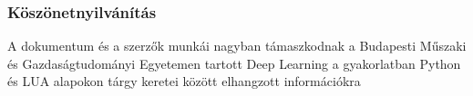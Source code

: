 \subsubsection*{Köszönetnyilvánítás}

A dokumentum és a szerzők munkái nagyban támaszkodnak a Budapesti Műszaki és Gazdaságtudományi Egyetemen tartott Deep Learning a gyakorlatban Python és LUA alapokon tárgy keretei között elhangzott információkra